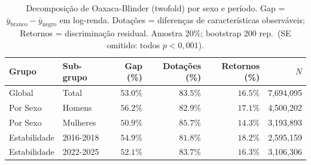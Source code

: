 \begin{table}[H]
\centering
\caption{Decomposição de Oaxaca-Blinder (twofold) por sexo e período.
         Gap = $\bar{y}_{\text{branco}} - \bar{y}_{\text{negro}}$ em log-renda.
         Dotações = diferenças de características observáveis;
         Retornos = discriminação residual.
         Amostra 20\%; bootstrap 200 rep.\ (SE omitido: todos $p<0{,}001$).}
\label{tab:ob_melhorias}
\small
\begin{tabular}{llrrrr}
\toprule
Grupo & Sub-grupo & Gap (\%) & Dotações (\%) & Retornos (\%) & $N$ \\
\midrule
Global & Total & $53.0\%$ & $83.5\%$ & $16.5\%$ & 7,694,095 \\
Por Sexo & Homens & $56.2\%$ & $82.9\%$ & $17.1\%$ & 4,500,202 \\
Por Sexo & Mulheres & $50.9\%$ & $85.7\%$ & $14.3\%$ & 3,193,893 \\
Estabilidade & 2016-2018 & $54.9\%$ & $81.8\%$ & $18.2\%$ & 2,595,159 \\
Estabilidade & 2022-2025 & $52.1\%$ & $83.7\%$ & $16.3\%$ & 3,106,306 \\
\bottomrule
\end{tabular}
\end{table}
